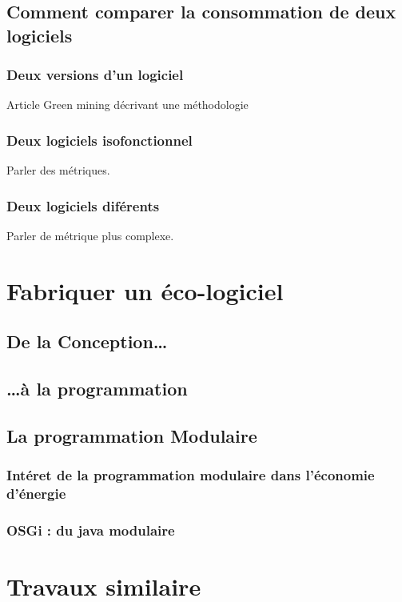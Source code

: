 \documentclass[a4paper, 11pt]{report}
\begin{document}
		\subsection{Comment comparer la consommation de deux logiciels}
			\subsubsection{Deux versions d'un logiciel}
Article Green mining\cite{GreenMining} décrivant une méthodologie

			\subsubsection{Deux logiciels isofonctionnel}
Parler des métriques.

			\subsubsection{Deux logiciels diférents}
Parler de métrique plus complexe.
		
	\section{Fabriquer un éco-logiciel}
		\subsection{De la Conception\ldots}
		
		\subsection{\ldots à la programmation}
		
		\subsection{La programmation Modulaire}
			\subsubsection{Intéret de la programmation modulaire dans l'économie d'énergie}
			\subsubsection{OSGi : du java modulaire}
		
		
		
	\section{Travaux similaire}
\end{document}
